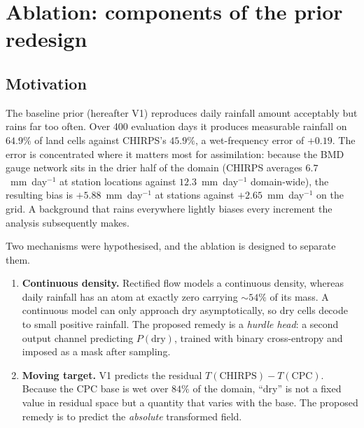 %

\section{Ablation: components of the prior redesign}
\label{sec:ablation-v3}

\subsection{Motivation}

The baseline prior (hereafter V1) reproduces daily rainfall amount acceptably but
rains far too often. Over 400 evaluation days it produces measurable rainfall on
$64.9\%$ of land cells against CHIRPS's $45.9\%$, a wet-frequency error of
$+0.19$. The error is concentrated where it matters most for assimilation:
because the BMD gauge network sits in the drier half of the domain (CHIRPS
averages $6.7$~mm~day$^{-1}$ at station locations against $12.3$~mm~day$^{-1}$
domain-wide), the resulting bias is $+5.88$~mm~day$^{-1}$ at stations against
$+2.65$~mm~day$^{-1}$ on the grid. A background that rains everywhere lightly
biases every increment the analysis subsequently makes.

Two mechanisms were hypothesised, and the ablation is designed to separate them.

\begin{enumerate}
  \item \textbf{Continuous density.} Rectified flow models a continuous
    density, whereas daily rainfall has an atom at exactly zero carrying
    ${\sim}54\%$ of its mass. A continuous model can only approach dry
    asymptotically, so dry cells decode to small positive rainfall. The proposed
    remedy is a \emph{hurdle head}: a second output channel predicting
    $P(\text{dry})$, trained with binary cross-entropy and imposed as a mask
    after sampling.
  \item \textbf{Moving target.} V1 predicts the residual
    $T(\mathrm{CHIRPS}) - T(\mathrm{CPC})$. Because the CPC base is wet over
    $84\%$ of the domain, ``dry'' is not a fixed value in residual space but a
    quantity that varies with the base. The proposed remedy is to predict the
    \emph{absolute} transformed field.
\end{enumerate}

